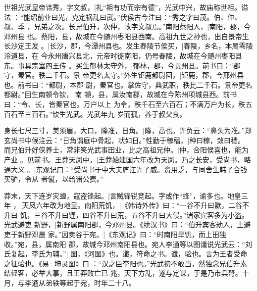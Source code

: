 \documentclass{article}
\begin{document}
\begin{withgezhu}
世祖光武皇帝讳秀，字文叔，|{礼“{祖有功而宗有德}”，光武中兴，故庙称世祖。谥法
：“能绍前业曰光，克定祸乱曰武。”伏侯古今注曰：“秀之字曰茂。伯、仲、叔、季
，兄弟之次。长兄伯升，次仲，故字文叔焉。”}南阳蔡阳人，|{南阳，郡，今邓州县
也。蔡阳，县，故城在今随州枣阳县西南。}高祖九世之孙也，出自景帝生长沙定王发
。|{长沙，郡，今潭州县也。}发生舂陵节侯买，|{舂陵，乡名，本属零陵泠道县，在
今永州唐兴县北，元帝时徙南阳，仍号舂陵，故城在今随州枣阳县东。事具宗室四王传
。}买生郁林太守外，|{郁林，郡，今贵州县。前书曰：“郡守，秦官。秩二千石。景
帝更名太守。”}外生钜鹿都尉回，|{钜鹿，郡，今邢州县也。前书曰：“都尉，本{郡
尉}，秦官也。掌佐守，典武职，秩比二千石。景帝更名都尉。”}回生南顿令钦，|{南
顿，县，属汝南郡，故城在今陈州项城县西。前书曰：“令、长，皆秦官也。万户以上
为令，秩千石至六百石；不满万户为长，秩五百石至三百石。”}钦生光武。光武年九
岁而孤，养于叔父良。

身长七尺三寸，美须眉，大口，隆准，日角。|{隆，高也。许负云：“鼻头为准。”郑
玄尚书中候注云：“日角谓庭中骨起，状如日。”}性勤于稼穑，|{种曰稼，敛曰穑。}
而兄伯升好侠养士，常非笑光武事田业，比之高祖兄仲。|{仲，合阳侯喜也，能为产业
。见前书。}王莽天凤中，|{王莽始建国六年改为天凤。}乃之长安，受尚书，略通大义
。|{东观记曰：“受尚书于中大夫庐江许子威。资用乏，与同舍生韩子合钱买驴，令从
者僦，以给诸公费。”}

莽末，天下连岁灾蝗，寇盗锋起。|{言贼锋锐竞起。字或作“蜂”，谕多也。}地皇三年
，|{天凤六年改为地皇。}南阳荒饥，|{《韩诗外传》曰：“一谷不升曰歉，二谷不升曰
饥，三谷不升曰馑，四谷不升曰荒，五谷不升曰大侵。”}诸家宾客多为小盗。光武避吏
新野，|{新野属南阳郡，今邓州县。《续汉书》曰：“伯升宾客劫人，上避吏于新野邓晨
家。”}因卖谷于宛。|{《东观记》曰：“时南阳旱饥，而上田独收。”宛，县，属南阳
郡，故城今邓州南阳县也。}宛人李通等以图谶说光武云：“刘氏复起，李氏为辅。”|{
图，《河图》也。谶，符命之书。谶，验也。言为王者受命之征验也。《易·坤灵图》曰
：“汉之臣李阳也。”}光武初不敢当，然独念兄伯升素结轻客，必举大事，且王莽败亡已
兆，天下方乱，遂与定谋，于是乃市兵弩。十月，与李通从弟轶等起于宛，时年二十八。


\end{withgezhu}
\end{document}
